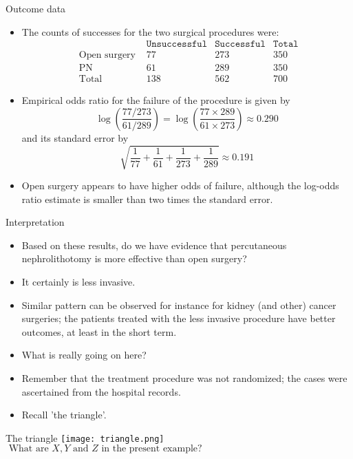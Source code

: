 \documentclass[10pt]{beamer}\usepackage[]{graphicx}\usepackage[]{color}
\begin{document}
\begin{frame}{Outcome data}
\begin{itemize}
	\item The counts of successes for the two surgical procedures were:
	$$
	\begin{array}{lccc}
	                       &\texttt{Unsuccessful}& \texttt{Successful}& \texttt{Total}\\
	\text { Open surgery } & 77 & 273 & 350 \\
	\text { PN } & 61 & 289 & 350 \\
	\text { Total } & 138 & 562 & 700
	\end{array}
	$$
	\item  Empirical odds ratio for the failure of the procedure is given by
	$$
	\log \left(\frac{77 / 273}{61 / 289}\right)=\log \left(\frac{77 \times 289}{61 \times 273}\right) \approx 0.290
	$$
	and its standard error by
	$$
	\sqrt{\frac{1}{77}+\frac{1}{61}+\frac{1}{273}+\frac{1}{289}} \approx 0.191
	$$
	\item Open surgery appears to have higher odds of failure, although the log-odds ratio estimate is smaller than two times the standard error.
\end{itemize}
\end{frame}


\begin{frame}{Interpretation}
\begin{itemize}
	\item Based on these results, do we have evidence that percutaneous nephrolithotomy is more effective than open surgery?
	\item It certainly is less invasive.
	\item Similar pattern can be observed for instance for kidney (and other) cancer surgeries; the patients treated with the less invasive procedure have better outcomes, at least in the short term.
	\item  What is really going on here?
	\item  Remember that the treatment procedure was not randomized; the cases were ascertained from the hospital records.
	\item  Recall 'the triangle'.
\end{itemize}
\end{frame}


\begin{frame}{The triangle}
\centering
\texttt{[image: triangle.png]}
\vspace{0.3in}
$\text { What are } X, Y \text { and } Z \text { in the present example? }$
\end{frame}
\end{document}
